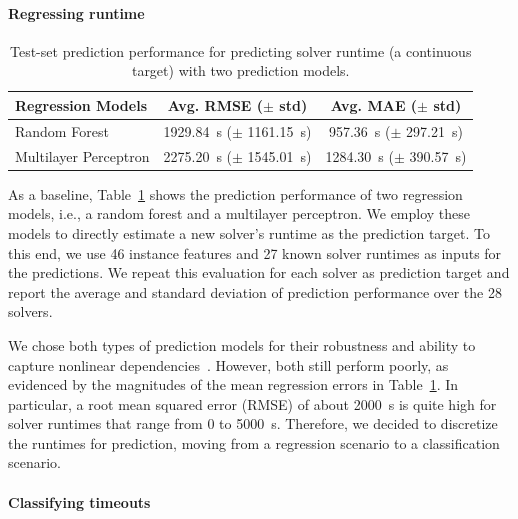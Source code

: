 \documentclass[sn-basic, Numbered]{sn-jnl} %
\begin{document}
\paragraph{Regressing runtime}

\begin{table}[tb]
	\centering
	\caption{Test-set prediction performance for predicting solver runtime (a continuous target) with two prediction models.}
	\label{tab:regression}
	\begin{tabular}{lcc}
		\toprule
		{Regression Models} & {Avg. RMSE ($\pm$ std)} & {Avg. MAE ($\pm$ std)} \\
		\midrule
		Random Forest & \SI{1929.84}{s} ($\pm$ \SI{1161.15}{s}) & \phantom{0}\SI{957.36}{s} ($\pm$ \SI{297.21}{s}) \\[0.4ex]
		Multilayer Perceptron & \SI{2275.20}{s} ($\pm$ \SI{1545.01}{s}) & \SI{1284.30}{s} ($\pm$ \SI{390.57}{s}) \\
		\bottomrule
	\end{tabular}
\end{table}

As a baseline, Table~\ref{tab:regression} shows the prediction performance of two regression models, i.e., a random forest and a multilayer perceptron.
We employ these models to directly estimate a new solver's runtime as the prediction target.
To this end, we use 46 instance features and 27 known solver runtimes as inputs for the predictions.
We repeat this evaluation for each solver as prediction target and report the average and standard deviation of prediction performance over the 28 solvers.

We chose both types of prediction models for their robustness and ability to capture nonlinear dependencies~\cite{breiman2001random}.
However, both still perform poorly, as evidenced by the magnitudes of the mean regression errors in Table~\ref{tab:regression}.
In particular, a root mean squared error (RMSE) of about \SI{2000}{s} is quite high for solver runtimes that range from 0 to \SI{5000}{s}.
Therefore, we decided to discretize the runtimes for prediction, moving from a regression scenario to a classification scenario.

\paragraph{Classifying timeouts}
\end{document}
